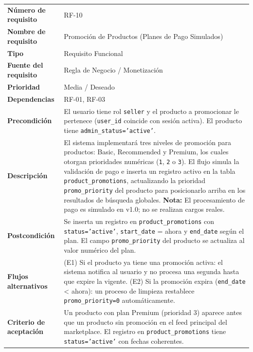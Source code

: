 \documentclass[11pt,a4paper]{report}
\begin{document}
\begin{table}[H]
\centering
\begin{tabularx}{\textwidth}{|l|L|}
\hline
{} \\ \hline
\textbf{Número de requisito} & RF-10 \\ \hline
\textbf{Nombre de requisito} & Promoción de Productos (Planes de Pago Simulados) \\ \hline
\textbf{Tipo} & Requisito Funcional \\ \hline
\textbf{Fuente del requisito} & Regla de Negocio / Monetización \\ \hline
\textbf{Prioridad} & Media / Deseado \\ \hline
\textbf{Dependencias} & RF-01, RF-03 \\ \hline
\textbf{Precondición} & El usuario tiene rol \texttt{seller} y el producto a promocionar le pertenece (\texttt{user\_id} coincide con sesión activa). El producto tiene \texttt{admin\_status='active'}. \\ \hline
\textbf{Descripción} & El sistema implementará tres niveles de promoción para productos: Basic, Recommended y Premium, los cuales otorgan prioridades numéricas (\texttt{1}, \texttt{2} o \texttt{3}). El flujo simula la validación de pago e inserta un registro activo en la tabla \texttt{product\_promotions}, actualizando la prioridad \texttt{promo\_priority} del producto para posicionarlo arriba en los resultados de búsqueda globales. \textbf{Nota:} El procesamiento de pago es simulado en v1.0; no se realizan cargos reales. \\ \hline
\textbf{Postcondición} & Se inserta un registro en \texttt{product\_promotions} con \texttt{status='active'}, \texttt{start\_date} = ahora y \texttt{end\_date} según el plan. El campo \texttt{promo\_priority} del producto se actualiza al valor numérico del plan. \\ \hline
\textbf{Flujos alternativos} & (E1) Si el producto ya tiene una promoción activa: el sistema notifica al usuario y no procesa una segunda hasta que expire la vigente. (E2) Si la promoción expira (\texttt{end\_date} < ahora): un proceso de limpieza restablece \texttt{promo\_priority=0} automáticamente. \\ \hline
\textbf{Criterio de aceptación} & Un producto con plan Premium (prioridad 3) aparece antes que un producto sin promoción en el feed principal del marketplace. El registro en \texttt{product\_promotions} tiene \texttt{status='active'} con fechas coherentes. \\ \hline
\end{tabularx}
\end{table}
\end{document}
